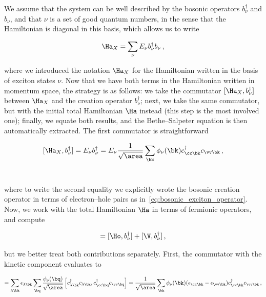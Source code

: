 We assume that the system can be well described by the bosonic operators $b^\dagger_{\nu}$ and $b_{\nu}$, and that $\nu$ is a set of good quantum numbers, in the sense that the Hamiltonian is diagonal in this basis, which allows us to write

\begin{equation}
    \Ha_X = \sum_{\nu} E_{\nu} b^{\dagger}_{\nu} b_{\nu}\,,
\end{equation}

\noindent where we introduced the notation $\Ha_X$ for the Hamiltonian written in the basis of exciton states $\nu$.
Now that we have both terms in the Hamiltonian written in momentum space, the strategy is as follows: we take the commutator $[\Ha_X, b^{\dagger}_{\nu}]$ between $\Ha_X$ and the creation operator $b^{\dagger}_{\nu}$; next, we take the same commutator, but with the initial total Hamiltonian $\Ha$ instead (this step is the most involved one); finally, we equate both results, and the Bethe--Salpeter equation is then automatically extracted.
The first commutator is straightforward
    
\begin{equation}
    \label{eq:H_X_commutator}
    [\Ha_X, b^{\dagger}_{\nu}] = E_{\nu} b_\nu^{\dagger} = E_\nu \frac{1}{\sqrt{\area}} \sum_{\bk} \phi_\nu(\bk) c^{\dagger}_{\cc  \bk} c_{\vv \bk}\,,
\end{equation}\

\noindent where to write the second equality we explicitly wrote the bosonic creation operator in terms of electron--hole pairs as in~\eqref{eq:bosonic_exciton_operator}.
Now, we work with the total Hamiltonian $\Ha$ in terms of fermionic operators, and compute

\begin{equation}
[\Ha, b^{\dagger}_{\nu}] = [\Ho, b^{\dagger}_{\nu}] + [\V, b^{\dagger}_{\nu}]\,,
\end{equation}

\noindent but we better treat both contributions separately.
First, the commutator with the kinetic component evaluates to

\begin{equation}
    [\Ho, b^{\dagger}_{\nu}] = \sum_{\lambda \bk} \epsilon_{\lambda \bk} \sum_{\bq} \frac{\phi_{\nu}(\bq)}{\sqrt{\area}} \left [c^{\dagger}_{\lambda \bk} c_{\lambda \bk}, c^{\dagger}_{\cc  \bq} c_{\vv \bq} \right ] = \frac{1}{\sqrt{\area}} \sum_{\bk} \phi_{\nu}(\bk) (\epsilon_{\cc  \bk} - \epsilon_{\vv \bk}) c^{\dagger}_{\cc  \bk} c_{\vv \bk} \,,
\end{equation}

